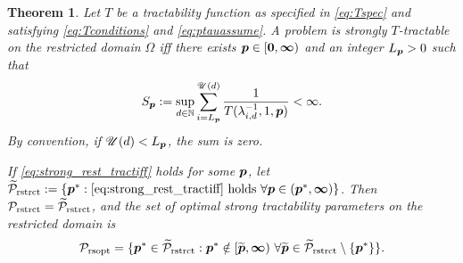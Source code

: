 \documentclass[sort&compress]{elsarticle}
\newcommand{\theUB}{\mathscr{U}}
\newtheorem{theorem}{Theorem}
\begin{document}
\begin{theorem}\label{thm_main_rest_strong_tract}
Let $T$ be a tractability function as specified in \eqref{eq:Tspec} and satisfying \eqref{eq:Tconditions} and \eqref{eq:ptauassume}.  A problem is strongly $T$-tractable \emph{on the restricted domain $\Omega$} iff there exists $\boldsymbol{p} \in [\boldsymbol{0}, \boldsymbol{\infty})$ and an integer $L_{\boldsymbol{p}} > 0$ such that
\begin{equation} \label{eq:strong_rest_tractiff}
     S_{\vp}:=\sup_{d \in \naturals} \sum_{i = L_{\vp}}^{\theUB(d)} \frac{1}{T(\lambda_{i,d}^{-1},1,\vp)} < \infty.
\end{equation}
By convention, if $\theUB(d) < L_{\vp}$, the sum is zero.

If \eqref{eq:strong_rest_tractiff} holds for some $\boldsymbol{p}$, let  $\widetilde{\mathcal{P}}_{\textup{rstrct}} : = \{\boldsymbol{p}^* : \eqref{eq:strong_rest_tractiff} \text{ holds }\forall \boldsymbol{p} \in (\boldsymbol{p}^*,\boldsymbol{\infty})\}$.  Then $\mathcal{P}_{\textup{rstrct}} = \widetilde{\mathcal{P}}_{\textup{rstrct}}$, and the set of optimal strong tractability parameters on the restricted domain is
\[
	\mathcal{P}_{\textup{rsopt}} =
	\{\boldsymbol{p}^* \in \widetilde{\mathcal{P}}_{\textup{rstrct}} :  \boldsymbol{p}^* \notin [\widetilde{\boldsymbol{p}},\boldsymbol{\infty}) \ \forall \widetilde{\boldsymbol{p}}\in  \widetilde{\mathcal{P}}_{\textup{rstrct}} \setminus \{\boldsymbol{p}^*\} \}.
\]
\end{theorem}
\end{document}
